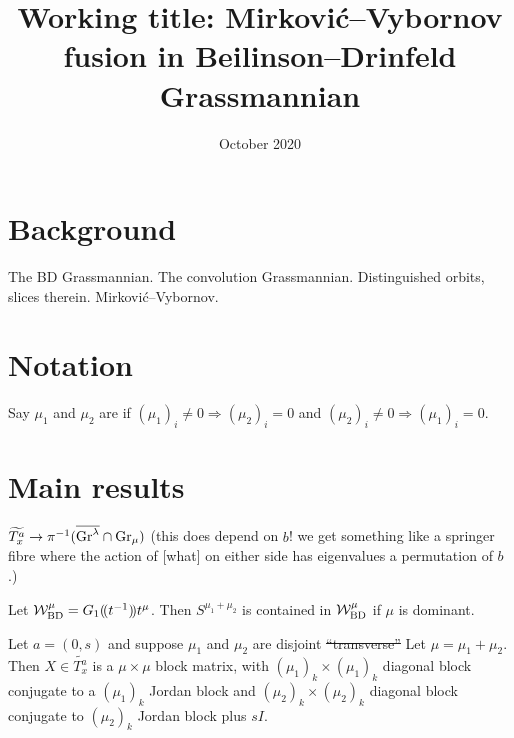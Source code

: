 \documentclass{article}
\title{Working title: Mirkovi\'c--Vybornov fusion in Beilinson--Drinfeld Grassmannian}
\date{October 2020}
\begin{document}
\maketitle

\section{Background}

The BD Grassmannian. The convolution Grassmannian. Distinguished orbits, slices therein. Mirkovi\'c--Vybornov.

\section{Notation}

\begin{definition}
    Say $\mu_1$ and $\mu_2$ are  if $(\mu_1)_i\ne 0 \Rightarrow (\mu_2)_i = 0$ and $(\mu_2)_i\ne 0 \Rightarrow (\mu_1)_i = 0$. 
\end{definition}


\section{Main results}

\begin{claim}
$\widetilde{T_x^a}\to\pi^{-1}(\overline{\Gr^\lambda}\cap\Gr_\mu)$ (this does depend on $b$! we get something like a springer fibre where the action of [what] on either side has eigenvalues a permutation of $b$.)
\end{claim}

\begin{claim}
Let $\cW^\mu_{\rm BD} = G_1\xT[t^{-1}]t^\mu$. Then $S^{\mu_1 + \mu_2}$ is contained in $\cW^\mu_{\rm BD}$ if $\mu$ is dominant.  
\end{claim}

\begin{claim}
Let $a = (0,s)$ and suppose $\mu_1$ and $\mu_2$ are disjoint \sout{``transverse''} 
Let $\mu = \mu_1 + \mu_2$. Then $X\in\widetilde{T_x^a}$ is a $\mu\times\mu$ block matrix, with $(\mu_1)_k\times(\mu_1)_k$ diagonal block conjugate to a $(\mu_1)_k$ Jordan block and $(\mu_2)_k\times (\mu_2)_k$ diagonal block conjugate to $(\mu_2)_k$ Jordan block plus $sI$.
\end{claim}
\end{document}
